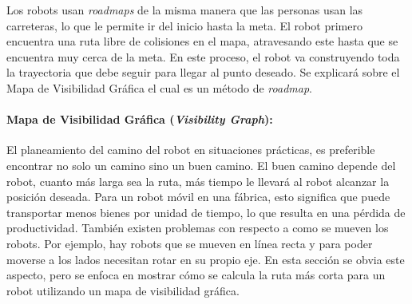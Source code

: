 Los robots usan \textit{roadmaps} de la misma manera que las personas usan 
las carreteras, lo que le permite ir del inicio hasta la meta. El robot 
primero encuentra una ruta libre de colisiones en el mapa, atravesando este 
hasta que se encuentra muy cerca de la meta. En este proceso, el robot va 
construyendo toda la trayectoria que debe seguir para llegar al punto 
deseado. Se explicará sobre el Mapa de Visibilidad Gráfica el cual es 
un método de \textit{roadmap}.




\paragraph{Mapa de Visibilidad Gr\'afica (\textit{Visibility Graph}):}

El planeamiento del camino del robot en situaciones prácticas, es preferible 
encontrar no solo un camino sino un buen camino. El buen camino depende del 
robot, cuanto más larga sea la ruta, más tiempo le llevará al robot 
alcanzar la posición deseada. Para un robot móvil en una fábrica, esto 
significa que puede transportar menos bienes por unidad de tiempo, lo que 
resulta en una pérdida de productividad. También existen problemas con 
respecto a como se mueven los robots. Por ejemplo, hay robots que se mueven 
en línea recta y para poder moverse a los lados necesitan rotar en su 
propio eje. En esta sección se obvia este aspecto, pero se enfoca en 
mostrar cómo se calcula la ruta más corta para un robot utilizando 
un mapa de visibilidad gráfica.

